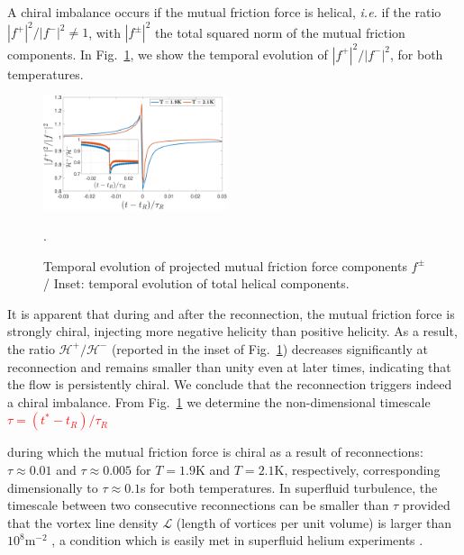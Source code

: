 \documentclass[%
 reprint,
 amsmath,amssymb,
 aps,
 prl,
]{revtex4-2}
\def\red#1{\textcolor{red}{#1}}
\begin{document}
{A chiral imbalance occurs if the mutual friction force is helical, 
\textit{i.e.} if the ratio $|f^+|^2/|f^-|^2 \neq 1$, with $|f^\pm|^2$ the total squared norm of the mutual friction components. 
In Fig.~\ref{fig:mutual-friction-decomp}, we show the temporal evolution of $|f^+|^2/|f^-|^2$, for both temperatures. 
%
\begin{figure}[h!]
    \centering
    \includegraphics*[width=0.48\textwidth]{fmfDecompFig.pdf}
    \caption{Temporal evolution of projected mutual friction force components $f^\pm$/ Inset: temporal evolution of total helical components.}.
    \label{fig:mutual-friction-decomp}
\end{figure}
%
It is apparent
that during and after the reconnection, the mutual friction force is strongly chiral,
injecting more negative helicity than positive helicity. 
As a result, the ratio $\mathcal{H}^+/\mathcal{H}^-$ 
(reported in the inset of Fig.~\ref{fig:mutual-friction-decomp}) 
decreases significantly at reconnection and remains smaller than unity even at later times, 
indicating that the flow is persistently chiral. We conclude that the reconnection triggers indeed a chiral imbalance.
From Fig.~\ref{fig:mutual-friction-decomp} we determine the non-dimensional timescale \red{$\tau = (t^*-t_R)/\tau_R$}

during which the mutual friction force is chiral as a result of reconnections: $\tau \approx 0.01$ and $\tau \approx 0.005$
for $T=1.9$K and $T=2.1$K, respectively, corresponding dimensionally to $\tau \approx 0.1$s for both temperatures. 
In superfluid turbulence, the timescale between two consecutive reconnections can be smaller than $\tau$ provided that the
vortex line density $\mathcal{L}$ (length of vortices per unit volume) is larger than $10^8 \text{m}^{-2}$ \cite{stasiak2024quantum,barenghi2004},
a condition which is easily met in superfluid helium experiments \cite{roche2007,Babuin2014}.




}
\end{document}
